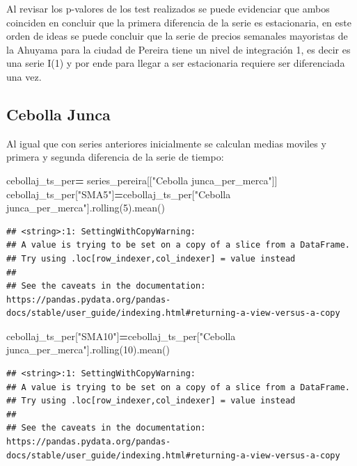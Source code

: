 \documentclass[
]{book}
\newenvironment{Shaded}{\begin{snugshade}}{\end{snugshade}}
\newcommand{\DecValTok}[1]{\textcolor[rgb]{0.00,0.00,0.81}{#1}}
\newcommand{\NormalTok}[1]{#1}
\newcommand{\OperatorTok}[1]{\textcolor[rgb]{0.81,0.36,0.00}{\textbf{#1}}}
\newcommand{\StringTok}[1]{\textcolor[rgb]{0.31,0.60,0.02}{#1}}
\begin{document}
Al revisar los p-valores de los test realizados se puede evidenciar que ambos coinciden en concluir que la primera diferencia de la serie es estacionaria, en este orden de ideas se puede concluir que la serie de precios semanales mayoristas de la Ahuyama para la ciudad de Pereira tiene un nivel de integración 1, es decir es una serie I(1) y por ende para llegar a ser estacionaria requiere ser diferenciada una vez.

\hypertarget{cebolla-junca-1}{%
\subsection{Cebolla Junca}\label{cebolla-junca-1}}

Al igual que con series anteriores inicialmente se calculan medias moviles y primera y segunda diferencia de la serie de tiempo:

\begin{Shaded}
\begin{Highlighting}[]

\NormalTok{cebollaj\_ts\_per}\OperatorTok{=}\NormalTok{ series\_pereira[[}\StringTok{"Cebolla junca\_per\_merca"}\NormalTok{]]}
\NormalTok{cebollaj\_ts\_per[}\StringTok{"SMA5"}\NormalTok{]}\OperatorTok{=}\NormalTok{cebollaj\_ts\_per[}\StringTok{"Cebolla junca\_per\_merca"}\NormalTok{].rolling(}\DecValTok{5}\NormalTok{).mean()}
\end{Highlighting}
\end{Shaded}

\begin{verbatim}
## <string>:1: SettingWithCopyWarning: 
## A value is trying to be set on a copy of a slice from a DataFrame.
## Try using .loc[row_indexer,col_indexer] = value instead
## 
## See the caveats in the documentation: https://pandas.pydata.org/pandas-docs/stable/user_guide/indexing.html#returning-a-view-versus-a-copy
\end{verbatim}

\begin{Shaded}
\begin{Highlighting}[]
\NormalTok{cebollaj\_ts\_per[}\StringTok{"SMA10"}\NormalTok{]}\OperatorTok{=}\NormalTok{cebollaj\_ts\_per[}\StringTok{"Cebolla junca\_per\_merca"}\NormalTok{].rolling(}\DecValTok{10}\NormalTok{).mean()}
\end{Highlighting}
\end{Shaded}

\begin{verbatim}
## <string>:1: SettingWithCopyWarning: 
## A value is trying to be set on a copy of a slice from a DataFrame.
## Try using .loc[row_indexer,col_indexer] = value instead
## 
## See the caveats in the documentation: https://pandas.pydata.org/pandas-docs/stable/user_guide/indexing.html#returning-a-view-versus-a-copy
\end{verbatim}
\end{document}
